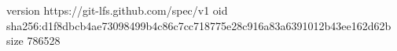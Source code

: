 version https://git-lfs.github.com/spec/v1
oid sha256:d1f8dbcb4ae73098499b4c86c7cc718775e28c916a83a6391012b43ee162d62b
size 786528
